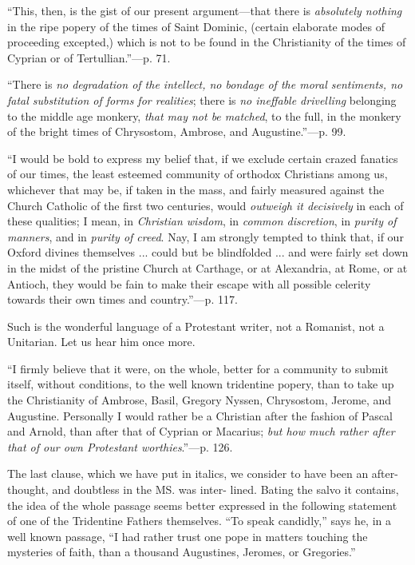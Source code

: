 ``This, then, is the gist of our present
argument—that there is \emph{absolutely nothing} in the ripe popery of
the times of Saint Dominic, (certain elaborate modes of proceeding
excepted,) which is not to be found in the Christianity of the times of
Cyprian or of Tertullian.''—p. 71.

``There is \emph{no degradation of the intellect, no
bondage of the moral sentiments, no fatal substitution of forms for
realities}; there is \emph{no ineffable drivelling} belonging to the
middle age monkery, \emph{that may not be matched}, to the full, in the
monkery of the bright times of Chrysostom, Ambrose, and Augustine.''—p.
99.

``I would be bold to express my belief that, if we
exclude certain crazed fanatics of our times, the least esteemed
community of orthodox Christians among us, whichever that may be, if
taken in the mass, and fairly measured against the Church Catholic of
the first two centuries, would \emph{outweigh it decisively} in each of
these qualities; I mean, in \emph{Christian wisdom}, in \emph{common
discretion}, in \emph{purity of manners}, and in \emph{purity of creed}.
Nay, I am strongly tempted to think that, if our Oxford divines themselves ... could but be blindfolded ... and were fairly set down in
the midst of the pristine Church at Carthage, or at Alexandria, at Rome,
or at Antioch, they would be fain to make their escape with all possible
celerity towards their own times and country.''—p. 117.

Such is the wonderful language of a Protestant
writer, not a Romanist, not a Unitarian. Let us hear him once more.

``I firmly believe that it were, on the whole,
better for a community to submit itself, without conditions, to the well
known tridentine popery, than to take up the Christianity of Ambrose,
Basil, Gregory Nyssen, Chrysostom, Jerome, and Augustine. Personally I
would rather be a Christian after the fashion of Pascal and Arnold, than
after that of Cyprian or Macarius; \emph{but how much rather after that of
our own Protestant worthies}.''—p. 126.

The last clause, which we have put in italics, we
consider to have been an after-thought, and doubtless in the MS. was
inter- lined. Bating the salvo it contains, the idea of the whole
passage seems better expressed in the following statement of one of the
Tridentine Fathers themselves. ``To speak candidly,'' says he, in a well
known passage, ``I had rather trust one pope in matters touching the
mysteries of faith, than a thousand Augustines, Jeromes, or Gregories.''

